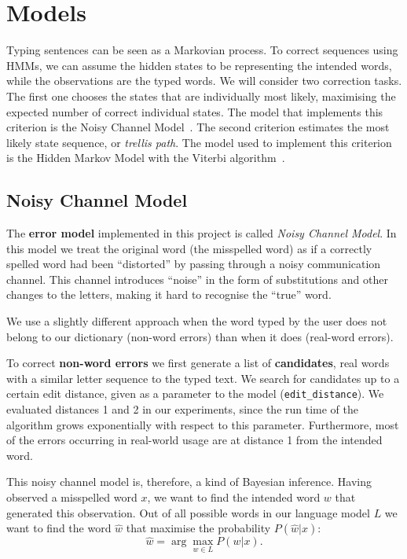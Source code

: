 \chapter{Models}

Typing sentences can be seen as a Markovian process. To correct sequences using HMMs, we can assume the 
hidden states to be representing the intended words, while the observations are the typed words.
We will consider two correction tasks. The first one chooses the states that are individually most likely, maximising 
the expected number of correct individual states. The model that implements this criterion is the Noisy Channel 
Model~\cite{martin2009speech}. The second criterion estimates the most likely state sequence, or \textit{trellis path}. 
The model used to implement this criterion is the Hidden Markov Model with the Viterbi 
algorithm~\cite{tarniceriu2015hmm}.


\section{Noisy Channel Model}
\label{section:ncm}
The \textbf{error model} implemented in this project is called \textit{Noisy Channel Model}. In this model we treat the 
original word (the misspelled word) as if a correctly spelled word had been “distorted” by passing through a noisy 
communication channel. This channel introduces “noise” in the form of substitutions and other changes to the letters, 
making it hard to recognise the “true” word.

We use a slightly different approach when the word typed by the user does not belong to our dictionary (non-word 
errors) than when it does (real-word errors).

To correct \textbf{non-word errors} we first generate a list of \textbf{candidates}, real words with a similar letter 
sequence to the typed text. We search for candidates up to a certain edit distance, given as a parameter to the model 
(\texttt{edit\_distance}). We evaluated distances 1 and 2 in our experiments, since the run time of the algorithm grows 
exponentially with respect to this parameter. Furthermore, most of the errors occurring in real-world usage are at 
distance 1 from the intended word.

This noisy channel model is, therefore, a kind of Bayesian inference.
Having observed a misspelled word $x$, we want to find the intended word $w$ that generated this observation.
Out of all possible words in our language model $L$ we want to find the word $\hat{w}$ that maximise the probability 
$P(\hat{w}|x)$:
\begin{equation}\label{eq:4.1}
\hat{w} = \arg\max_{w \in L} P(w|x) \mbox{.}
\end{equation}

